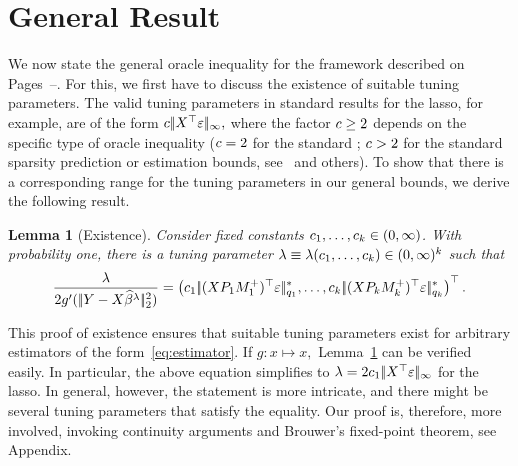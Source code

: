 \documentclass[bj]{imsart}
\newcommand{\normsup}[1]{\ensuremath{\!|\!| #1 | \! |_{\infty}}}
\newcommand{\normtwo}[1]{\ensuremath{\!|\!| #1 | \! |_{2}}}
\newcommand{\norm}[1]{\ensuremath{\!|\!| #1 | \! |}}
\newtheorem{lemma}{Lemma}[section]
\newcommand{\1}{{\rm 1}\mskip -4,5mu{\rm l} }
\begin{document}
\section{General Result}\label{sec:general}
We now state the general oracle inequality for the framework described on Pages~\pageref{sec:setting}--\pageref{endnotesign}. For this, we first have to discuss the existence of suitable tuning parameters. The valid tuning parameters in standard results for the lasso, for example, are of the form $\tuningrelax\,\normsup{\design^\top\noise},$ where the factor $\textcolor{black}{c}\geq 2$ depends on the specific type of oracle inequality ($\textcolor{black}{c}=2$ for the standard \pbos; $\textcolor{black}{c}>2$ for the standard sparsity prediction or estimation bounds, see~\cite{Bickel09,Chichignoud_Lederer_Wainwright14} and others). To show that there is a corresponding range for the tuning parameters in our general bounds, we derive the following result.
\begin{lemma}[Existence]\label{re:existence}
Consider fixed constants $\textcolor{black}{c}_1,\dots,\textcolor{black}{c}_{k}\in(0,\infty)$. With probability one, there is a tuning parameter $\lambda\equiv\lambda(\textcolor{black}{c}_1,\dots,\textcolor{black}{c}_{k})\in (0,\infty)^{k}$ such that
\begin{equation*}
\frac{\tuningparameter}{2g'(\,\normtwo{\outcome-\design\estimatort}^2)}=\left(\tuningrelax_1\,\norm{(\design  \projectionmatrix_1\fusedmatrix_1^{+})^\top \noise}_{q_1}^*,\dots,\tuningrelax_\numbergroups\,\norm{(\design  \projectionmatrix_\numbergroups\fusedmatrix_\numbergroups^{+})^\top \noise}_{q_\numbergroups}^*\right)^\top.
\end{equation*}
\end{lemma}
\noindent This proof of existence ensures that  suitable tuning parameters exist for arbitrary estimators of the form~\eqref{eq:estimator}. If $g:x\mapsto x,$ Lemma~\ref{re:existence} can be verified easily. In particular, the above equation simplifies to $\tuningparameter=2\tuningrelax_1\,\normsup{\design^\top\noise}$ for the lasso. In general, however, the statement is more intricate, and there might be several tuning parameters that satisfy the equality.  
Our proof is, therefore, more involved, invoking continuity arguments and Brouwer's fixed-point theorem, see Appendix. 
\end{document}
